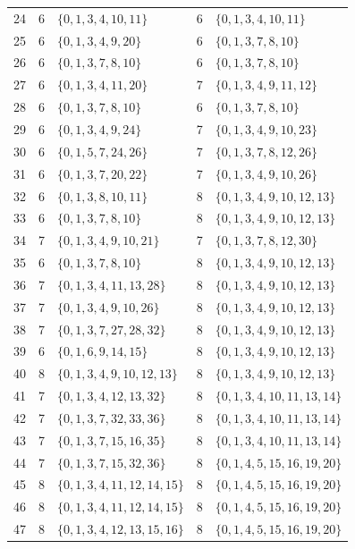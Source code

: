 \documentclass[11pt]{article}
\begin{document}
\begin{center}
\begin{longtable}{c c >{\raggedright\arraybackslash}p{} c >{\raggedright\arraybackslash}p{}}
			24 & 6 & \(\{0,1,3,4,10,11\}\) & 6 & \(\{0,1,3,4,10,11\}\) \\
			25 & 6 & \(\{0,1,3,4,9,20\}\) & 6 & \(\{0,1,3,7,8,10\}\) \\
			26 & 6 & \(\{0,1,3,7,8,10\}\) & 6 & \(\{0,1,3,7,8,10\}\) \\
			27 & 6 & \(\{0,1,3,4,11,20\}\) & 7 & \(\{0,1,3,4,9,11,12\}\) \\
			28 & 6 & \(\{0,1,3,7,8,10\}\) & 6 & \(\{0,1,3,7,8,10\}\) \\
			29 & 6 & \(\{0,1,3,4,9,24\}\) & 7 & \(\{0,1,3,4,9,10,23\}\) \\
			30 & 6 & \(\{0,1,5,7,24,26\}\) & 7 & \(\{0,1,3,7,8,12,26\}\) \\
			31 & 6 & \(\{0,1,3,7,20,22\}\) & 7 & \(\{0,1,3,4,9,10,26\}\) \\
			32 & 6 & \(\{0,1,3,8,10,11\}\) & 8 & \(\{0,1,3,4,9,10,12,13\}\) \\
			33 & 6 & \(\{0,1,3,7,8,10\}\) & 8 & \(\{0,1,3,4,9,10,12,13\}\) \\
			34 & 7 & \(\{0,1,3,4,9,10,21\}\) & 7 & \(\{0,1,3,7,8,12,30\}\) \\
			35 & 6 & \(\{0,1,3,7,8,10\}\) & 8 & \(\{0,1,3,4,9,10,12,13\}\) \\
			36 & 7 & \(\{0,1,3,4,11,13,28\}\) & 8 & \(\{0,1,3,4,9,10,12,13\}\) \\
			37 & 7 & \(\{0,1,3,4,9,10,26\}\) & 8 & \(\{0,1,3,4,9,10,12,13\}\) \\
			38 & 7 & \(\{0,1,3,7,27,28,32\}\) & 8 & \(\{0,1,3,4,9,10,12,13\}\) \\
			39 & 6 & \(\{0,1,6,9,14,15\}\) & 8 & \(\{0,1,3,4,9,10,12,13\}\) \\
			40 & 8 & \(\{0,1,3,4,9,10,12,13\}\) & 8 & \(\{0,1,3,4,9,10,12,13\}\) \\
			41 & 7 & \(\{0,1,3,4,12,13,32\}\) & 8 & \(\{0,1,3,4,10,11,13,14\}\) \\
			42 & 7 & \(\{0,1,3,7,32,33,36\}\) & 8 & \(\{0,1,3,4,10,11,13,14\}\) \\
			43 & 7 & \(\{0,1,3,7,15,16,35\}\) & 8 & \(\{0,1,3,4,10,11,13,14\}\) \\
			44 & 7 & \(\{0,1,3,7,15,32,36\}\) & 8 & \(\{0,1,4,5,15,16,19,20\}\) \\
			45 & 8 & \(\{0,1,3,4,11,12,14,15\}\) & 8 & \(\{0,1,4,5,15,16,19,20\}\) \\
			46 & 8 & \(\{0,1,3,4,11,12,14,15\}\) & 8 & \(\{0,1,4,5,15,16,19,20\}\) \\
			47 & 8 & \(\{0,1,3,4,12,13,15,16\}\) & 8 & \(\{0,1,4,5,15,16,19,20\}\) \\

\end{longtable}
\end{center}
\end{document}
